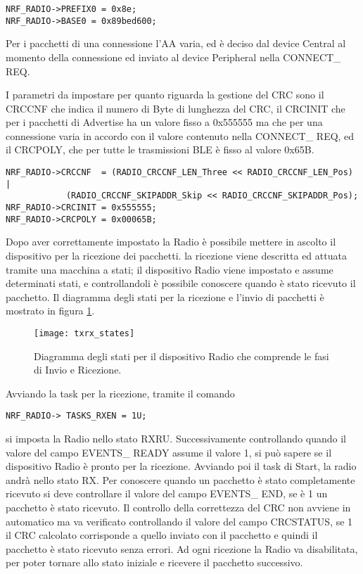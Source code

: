\begin{verbatim}
NRF_RADIO->PREFIX0 = 0x8e;
NRF_RADIO->BASE0 = 0x89bed600; 
\end{verbatim}
Per i pacchetti di una connessione l'AA varia, ed è deciso dal device Central al momento della connessione ed inviato al device Peripheral nella CONNECT\_ REQ.

I parametri da impostare per quanto riguarda la gestione del CRC sono il CRCCNF che indica il numero di Byte di lunghezza del CRC, il CRCINIT che per i pacchetti di Advertise ha un valore fisso a 0x555555 ma che per una connessione varia in accordo con il valore contenuto nella CONNECT\_ REQ, ed il CRCPOLY, che per tutte le trasmissioni BLE è fisso al valore 0x65B.

\begin{verbatim}
NRF_RADIO->CRCCNF  = (RADIO_CRCCNF_LEN_Three << RADIO_CRCCNF_LEN_Pos) |
            (RADIO_CRCCNF_SKIPADDR_Skip << RADIO_CRCCNF_SKIPADDR_Pos); 
NRF_RADIO->CRCINIT = 0x555555;  
NRF_RADIO->CRCPOLY = 0x00065B;
\end{verbatim}

Dopo aver correttamente impostato la Radio è possibile mettere in ascolto il dispositivo per la ricezione dei pacchetti. la ricezione viene descritta ed attuata tramite una macchina a stati; il dispositivo Radio viene impostato e assume determinati stati, e controllandoli è possibile conoscere quando è stato ricevuto il pacchetto. Il diagramma degli stati per la ricezione e l'invio di pacchetti è mostrato in figura \ref{txrx_states}.

\begin{figure}[H]
\texttt{[image: txrx\_states]}
\centering
\caption{Diagramma degli stati per il dispositivo Radio che comprende le fasi di Invio e Ricezione.}
\label{txrx_states}
\end{figure}

Avviando la task per la ricezione, tramite il comando 
\begin{verbatim}
NRF_RADIO-> TASKS_RXEN = 1U; 
\end{verbatim}
si imposta la Radio nello stato RXRU. Successivamente controllando quando il valore del campo EVENTS\_ READY assume il valore 1, si può sapere se il dispositivo Radio è pronto per la ricezione. Avviando poi il task di Start, la radio andrà nello stato RX. Per conoscere quando un pacchetto è stato completamente ricevuto si deve controllare il valore del campo EVENTS\_ END, se è 1 un pacchetto è stato ricevuto.
Il controllo della correttezza del CRC non avviene in automatico ma va verificato controllando il valore del campo CRCSTATUS, se 1 il CRC calcolato corrisponde a quello inviato con il pacchetto e quindi il pacchetto è stato ricevuto senza errori. Ad ogni ricezione la Radio va disabilitata, per poter tornare allo stato iniziale e ricevere il pacchetto successivo.

